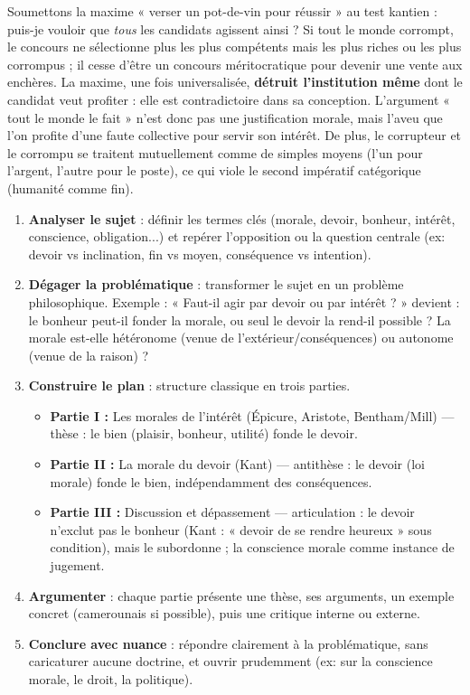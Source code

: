 \documentclass[11pt]{article}
\newcounter{popsec}
\newcounter{popsub}
\newcommand{\courssub}[1]{%
  \stepcounter{popsub}%
  \par\vspace{9pt}\noindent{\popxbold\fontsize{11.5}{13}\selectfont\color{popink}{\color{poporange}\thepopsec.\thepopsub}\hspace{6pt}#1}\par\nopagebreak\vspace{4pt}
}
\begin{document}
\begin{exemplebox}
Soumettons la maxime « verser un pot-de-vin pour réussir » au test kantien : puis-je vouloir que \emph{tous} les candidats agissent ainsi ? Si tout le monde corrompt, le concours ne sélectionne plus les plus compétents mais les plus riches ou les plus corrompus ; il cesse d'être un concours méritocratique pour devenir une vente aux enchères. La maxime, une fois universalisée, \textbf{détruit l'institution même} dont le candidat veut profiter : elle est contradictoire dans sa conception. L'argument « tout le monde le fait » n'est donc pas une justification morale, mais l'aveu que l'on profite d'une faute collective pour servir son intérêt. De plus, le corrupteur et le corrompu se traitent mutuellement comme de simples moyens (l'un pour l'argent, l'autre pour le poste), ce qui viole le second impératif catégorique (humanité comme fin).
\end{exemplebox}

\courssub{Méthode de la dissertation sur un sujet de morale}

\begin{methode}
\begin{enumerate}
\item \textbf{Analyser le sujet} : définir les termes clés (morale, devoir, bonheur, intérêt, conscience, obligation...) et repérer l'opposition ou la question centrale (ex: devoir vs inclination, fin vs moyen, conséquence vs intention).
\item \textbf{Dégager la problématique} : transformer le sujet en un problème philosophique. Exemple : « Faut-il agir par devoir ou par intérêt ? » devient : le bonheur peut-il fonder la morale, ou seul le devoir la rend-il possible ? La morale est-elle hétéronome (venue de l'extérieur/conséquences) ou autonome (venue de la raison) ?
\item \textbf{Construire le plan} : structure classique en trois parties. 
  \begin{itemize}
  \item \textbf{Partie I :} Les morales de l'intérêt (Épicure, Aristote, Bentham/Mill) — thèse : le bien (plaisir, bonheur, utilité) fonde le devoir.
  \item \textbf{Partie II :} La morale du devoir (Kant) — antithèse : le devoir (loi morale) fonde le bien, indépendamment des conséquences.
  \item \textbf{Partie III :} Discussion et dépassement — articulation : le devoir n'exclut pas le bonheur (Kant : « devoir de se rendre heureux » sous condition), mais le subordonne ; la conscience morale comme instance de jugement.
  \end{itemize}
\item \textbf{Argumenter} : chaque partie présente une thèse, ses arguments, un exemple concret (camerounais si possible), puis une critique interne ou externe.
\item \textbf{Conclure avec nuance} : répondre clairement à la problématique, sans caricaturer aucune doctrine, et ouvrir prudemment (ex: sur la conscience morale, le droit, la politique).
\end{enumerate}
\end{methode}
\end{document}
